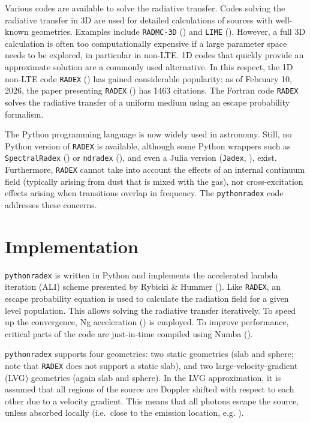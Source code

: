 \documentclass[
]{article}
\begin{document}
Various codes are available to solve the radiative transfer. Codes
solving the radiative transfer in 3D are used for detailed calculations
of sources with well-known geometries. Examples include
\texttt{RADMC-3D} ()
and \texttt{LIME} (). However, a full 3D calculation is often too computationally
expensive if a large parameter space needs to be explored, in particular
in non-LTE. 1D codes that quickly provide an approximate solution are a
commonly used alternative. In this respect, the 1D non-LTE code
\texttt{RADEX} ()
has gained considerable popularity: as of February 10, 2026, the paper
presenting \texttt{RADEX} () has 1463 citations. The Fortran code \texttt{RADEX} solves
the radiative transfer of a uniform medium using an escape probability
formalism.

The Python programming language is now widely used in astronomy. Still,
no Python version of \texttt{RADEX} is available, although some Python
wrappers such as \texttt{SpectralRadex}
() or
\texttt{ndradex} (), and even a
Julia version (\texttt{Jadex}, ),
exist. Furthermore, \texttt{RADEX} cannot take into account the effects
of an internal continuum field (typically arising from dust that is
mixed with the gas), nor cross-excitation effects arising when
transitions overlap in frequency. The \texttt{pythonradex} code
addresses these concerns.

\section{Implementation}\label{implementation}

\texttt{pythonradex} is written in Python and implements the accelerated
lambda iteration (ALI) scheme presented by Rybicki \& Hummer
(). Like \texttt{RADEX}, an escape
probability equation is used to calculate the radiation field for a
given level population. This allows solving the radiative transfer
iteratively. To speed up the convergence, Ng acceleration
() is employed. To improve performance,
critical parts of the code are just-in-time compiled using Numba
().

\texttt{pythonradex} supports four geometries: two static geometries
(slab and sphere; note that \texttt{RADEX} does not support a static slab), and two large-velocity-gradient (LVG) geometries
(again slab and sphere). In the LVG approximation, it is assumed that
all regions of the source are Doppler shifted with respect to each other
due to a velocity gradient. This means that all photons escape the
source, unless absorbed locally (i.e.~close to the emission location,
e.g. ).
\end{document}
